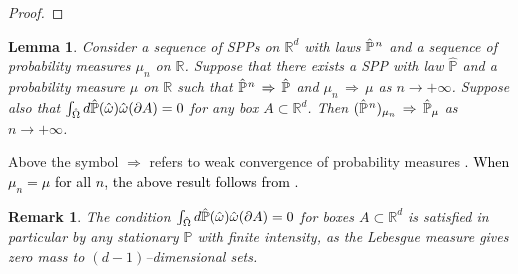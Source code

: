 \documentclass[12pt,a4paper,reqno]{amsart}
\newtheorem{Lemma}[Theorem]{Lemma}
\newtheorem{Remark}[Theorem]{Remark}
\newcommand{\bbP}{{\ensuremath{\mathbb P}} }
\newcommand{\bbR}{{\ensuremath{\mathbb R}} }
\let\O=\Omega \let\P=\Pi   \let\Ps=\Psi \let\Si=\Sigma \let\X=\Xi
\newcommand{\rosso}{\textcolor{black}} %
\newcommand{\pn}{\rosso{{\hat\bbP}^{\hspace{0.03cm}n}}}
\begin{document}
\begin{proof}
\end{proof}
\begin{Lemma}\label{weak_conv}
Consider a sequence of SPPs on $\bbR^d$  with laws $\pn$ and a sequence of probability measures $\mu_n$ on $\bbR$. Suppose that there exists a SPP   with law $\hat\bbP$ and a  probability measure $\mu$ on $\bbR$ such that  
$ \pn \,\Rightarrow \, \hat \bbP$  and $\mu_n \,\Rightarrow \, \mu$ as $n\to +\infty$.
Suppose also that $\int_{\hat \O}  d \hat \bbP(\hat \o ) \hat \o (\partial A)=0$ for any box $A\subset \bbR^d$.
Then $
 ( \pn)_{\mu_n} \,\Rightarrow \, \hat \bbP_\mu$ as $n\to +\infty$.
\end{Lemma}


Above  the symbol $\Rightarrow$ refers to weak convergence of probability measures \rosso{\cite{Bi}. When $\mu_n= \mu$ for all $ n$, the above result follows from \cite[Exercise~15,\,Chp.~16]{Kal}.}


 \begin{Remark}\label{condimento}The condition $\int_{\hat \O}  d \hat \bbP(\hat \o ) \hat \o (\partial A)=0$  for boxes $A\subset \bbR^d$  is satisfied in particular by any stationary $\bbP$ with finite intensity, as the Lebesgue measure gives zero mass to $(d-1)$--dimensional sets. 
 \end{Remark}
\end{document}
